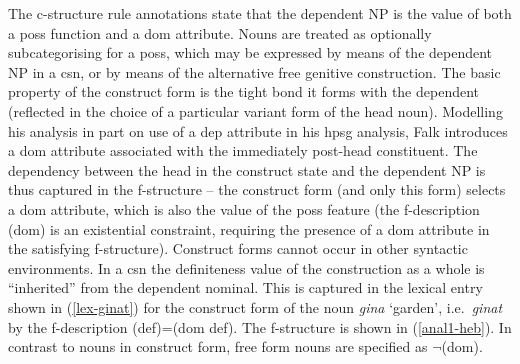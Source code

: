 \documentclass[output=paper,hidelinks]{langscibook}
\begin{document}
The c-structure rule annotations state that the dependent NP is the value of both a {\sc poss} function and a {\sc dom} attribute.
Nouns are treated as optionally subcategorising for a {\sc poss}, which may be expressed by means of the dependent NP in a {\sc csn}, or by means of the alternative free genitive construction.
The basic property of the construct form is the tight bond it forms with the dependent (reflected in the choice of a particular variant form of the head noun).  Modelling his analysis in part on  use of a {\sc dep} attribute in his {\sc hpsg} analysis, Falk introduces a {\sc dom} attribute associated with the immediately post-head constituent. The dependency between the  head in the construct state and the dependent NP is thus captured in the f-structure --  the construct form (and only this form)  selects a {\sc dom} attribute, which is also the value of the {\sc poss} feature (the f-description \mbox{(\UP\sc dom)} is an existential constraint, requiring the presence of a {\sc dom} attribute in the satisfying f-structure). Construct forms cannot occur in other syntactic environments.
In a {\sc csn} the definiteness value of the construction as a whole  is ``inherited'' from the dependent nominal.  This is captured in the lexical entry shown in (\ref{lex-ginat}) for the construct form of the noun {\em gina} `garden', i.e.\ {\em ginat} by the f-description {(\UP\sc def)=(\UP\sc dom def)}.  The f-structure is shown in (\ref{anal1-heb}). In contrast to nouns in construct form,  free form nouns are specified as {$\neg$(\UP\sc dom)}.



\ea\label{lex-ginat}
\hfill{\citep[92]{Falk01actnom}}
\z



\end{document}
